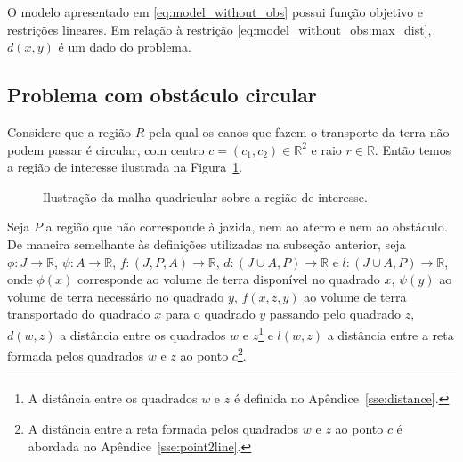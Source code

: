 O modelo apresentado em \eqref{eq:model_without_obs} possui função objetivo e
restrições lineares. Em relação à restrição
\eqref{eq:model_without_obs:max_dist}, $d(x, y)$ é um dado do problema.

\subsection{Problema com obstáculo circular}
Considere que a região $R$ pela qual os canos que fazem o transporte da terra
não podem passar é circular, com centro $c = (c_1, c_2) \in \mathbb{R}^2$ e raio
$r \in \mathbb{R}$. Então temos a região de interesse ilustrada na
Figura~\ref{fig:disc_J_A_R}.
\begin{figure}[!htb]
    \centering
    \caption{Ilustra\c{c}\~{a}o da malha quadricular sobre a regi\~{a}o de
    interesse.}
    \label{fig:disc_J_A_R}
\end{figure}

Seja $P$ a região que não corresponde \`{a} jazida, nem ao aterro e nem ao
obstáculo. De maneira semelhante \`{a}s definições utilizadas na subseção
anterior, seja $\phi: J \to \mathbb{R}$, $\psi: A \to \mathbb{R}$,
$f: (J, P, A) \to \mathbb{R}$, $d: (J \cup A, P) \to \mathbb{R}$ e $l:
(J \cup A, P) \to \mathbb{R}$, onde $\phi(x)$ corresponde ao volume de terra
disponível no quadrado $x$, $\psi(y)$ ao volume de terra necessário no quadrado
$y$, $f(x, z, y)$ ao volume de terra transportado do quadrado $x$ para o
quadrado $y$ passando pelo quadrado $z$, $d(w, z)$ a distância entre os
quadrados $w$ e $z$\footnote{A distância entre os quadrados $w$ e $z$ é
definida no Apêndice~\ref{sse:distance}.} e $l(w, z)$ a distância entre a reta
formada pelos quadrados $w$ e $z$ ao ponto $c$\footnote{A distância entre a
reta formada pelos quadrados $w$ e $z$ ao ponto $c$ é abordada no
Apêndice~\ref{sse:point2line}.}.

